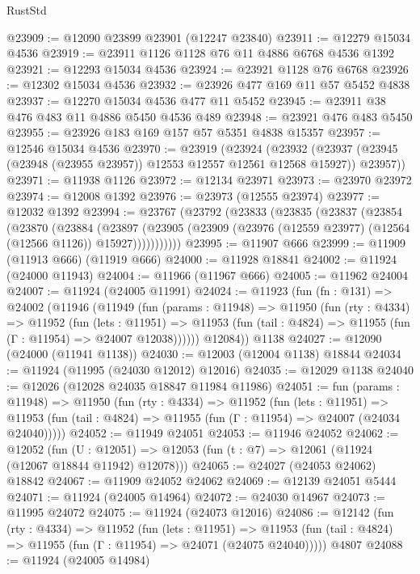 \begin{lexlean}{RustStd}
\begin{coremodule}
{\begin{coremodule}
{{{{{{{{{{{{{{{{{{{{{{{{{{{{{{{{{{{{{{{{{{{{{{{{{{{{{{{{{{{{{{{{{{{{{{{{{{{{{{{{@23909 := @12090 @23899 @23901 (@12247 @23840)
@23911 := @12279 @15034 @4536
@23919 := @23911 @1126 @1128 @76 @11 @4886 @6768 @4536 @1392
@23921 := @12293 @15034 @4536
@23924 := @23921 @1128 @76 @6768
@23926 := @12302 @15034 @4536
@23932 := @23926 @477 @169 @11 @57 @5452 @4838
@23937 := @12270 @15034 @4536 @477 @11 @5452
@23945 := @23911 @38 @476 @483 @11 @4886 @5450 @4536 @489
@23948 := @23921 @476 @483 @5450
@23955 := @23926 @183 @169 @157 @57 @5351 @4838 @15357
@23957 := @12546 @15034 @4536
@23970 := @23919
    (@23924
      (@23932 (@23937 (@23945 (@23948 (@23955 @23957)) @12553 @12557 @12561 @12568 @15927)) @23957))
@23971 := @11938 @1126
@23972 := @12134 @23971
@23973 := @23970 @23972
@23974 := @12008 @1392
@23976 := @23973 (@12555 @23974)
@23977 := @12032 @1392
@23994 := @23767
    (@23792
      (@23833
        (@23835
          (@23837
            (@23854
              (@23870
                (@23884
                  (@23897
                    (@23905
                      (@23909 (@23976 (@12559 @23977) (@12564 (@12566 @1126)) @15927)))))))))))
@23995 := @11907 @666
@23999 := @11909 (@11913 @666) (@11919 @666)
@24000 := @11928 @18841
@24002 := @11924 (@24000 @11943)
@24004 := @11966 (@11967 @666)
@24005 := @11962 @24004
@24007 := @11924 (@24005 @11991)
@24024 := @11923
    (fun (fn : @131) =>
    @24002
      (@11946
        (@11949
          (fun (params : @11948) =>
          @11950
            (fun (rty : @4334) =>
            @11952
              (fun (lets : @11951) =>
              @11953 (fun (tail : @4824) => @11955 (fun (Γ : @11954) => @24007 @12038))))))
        @12084))
    @1138
@24027 := @12090 (@24000 (@11941 @1138))
@24030 := @12003 (@12004 @1138) @18844
@24034 := @11924 (@11995 (@24030 @12012) @12016)
@24035 := @12029 @1138
@24040 := @12026 (@12028 @24035 @18847 @11984 @11986)
@24051 := fun (params : @11948) =>
  @11950
    (fun (rty : @4334) =>
    @11952
      (fun (lets : @11951) =>
      @11953 (fun (tail : @4824) => @11955 (fun (Γ : @11954) => @24007 (@24034 @24040)))))
@24052 := @11949 @24051
@24053 := @11946 @24052
@24062 := @12052
    (fun (U : @12051) => @12053 (fun (t : @7) => @12061 (@11924 (@12067 @18844 @11942) @12078)))
@24065 := @24027 (@24053 @24062) @18842
@24067 := @11909 @24052 @24062
@24069 := @12139 @24051 @5444
@24071 := @11924 (@24005 @14964)
@24072 := @24030 @14967
@24073 := @11995 @24072
@24075 := @11924 (@24073 @12016)
@24086 := @12142
    (fun (rty : @4334) =>
    @11952
      (fun (lets : @11951) =>
      @11953 (fun (tail : @4824) => @11955 (fun (Γ : @11954) => @24071 (@24075 @24040)))))
    @4807
@24088 := @11924 (@24005 @14984)
}}}}}}}}}}}}}}}}}}}}}}}}}}}}}}}}}}}}}}}}}}}}}}}}}}}}}}}}}}}}}}}}}}}}}}}}}}}}}}}}
\end{coremodule}}
\end{coremodule}
\end{lexlean}
